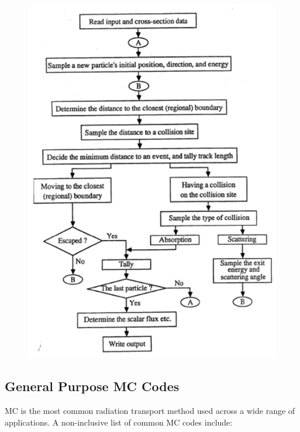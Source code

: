 \documentclass[12pt]{article}
\begin{document}
\begin{figure}[h!]
\begin{center}
\includegraphics[scale=0.80]{../figs/mcAlgo.png}
\end{center}
\end{figure}


\subsection*{General Purpose MC Codes}

MC is the most common radiation transport method used across a wide range of applications.  
A non-inclusive list of common MC codes include:
\end{document}
